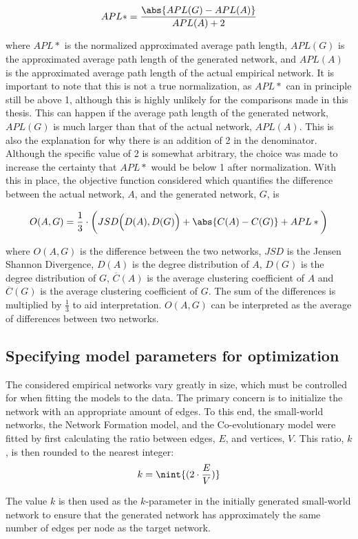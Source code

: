 \documentclass[11pt]{article}
\DeclarePairedDelimiter{\nint}\lfloor\rceil
\DeclarePairedDelimiter{\abs}\lvert\rvert
\begin{document}
$$APL* = \frac{\abs{APL(G) - APL(A)}}{APL(A)+2}$$

where $APL*$ is the normalized approximated average path length, $APL(G)$ is the approximated average path length of the generated network, and $APL(A)$ is the approximated average path length of the actual empirical network. It is important to note that this is not a true normalization, as $APL*$ can in principle still be above 1, although this is highly unlikely for the comparisons made in this thesis. This can happen if the average path length of the generated network, $APL(G)$ is much larger than that of the actual network, $APL(A)$. This is also the explanation for why there is an addition of 2 in the denominator. Although the specific value of 2 is somewhat arbitrary, the choice was made to increase the certainty that $APL*$ would be below 1 after normalization.
With this in place, the objective function considered which quantifies the difference between the actual network, $A$, and the generated network, $G$, is 

$$ O(A, G) = \frac{1}{3} \cdot \bigg(JSD \Big(D(A), D(G) \Big) + \abs{C(A) - C(G)} + APL*\bigg)$$

where $O(A, G)$ is the difference between the two networks, $JSD$ is the Jensen Shannon Divergence, $D(A)$ is the degree distribution of $A$, $D(G)$ is the degree distribution of $G$, $\overline{C}(A)$ is the average clustering coefficient of $A$ and $\overline{C}(G)$ is the average clustering coefficient of $G$. The sum of the differences is multiplied by $\frac{1}{3}$ to aid interpretation. $O(A,G)$ can be interpreted as the average of differences between two networks.

\subsection{Specifying model parameters for optimization}
The considered empirical networks vary greatly in size, which must be controlled for when fitting the models to the data. The primary concern is to initialize the network with an appropriate amount of edges. To this end, the small-world networks, the Network Formation model, and the Co-evolutionary model were fitted by first calculating the ratio between edges, $E$, and vertices, $V$. This ratio, $k$, is then rounded to the nearest integer: 
$$k = \nint{(2 \cdot \frac{E}{V})}$$

The value $k$ is then used as the $k$-parameter in the initially generated small-world network to ensure that the generated network has approximately the same number of edges per node as the target network. 
\end{document}
